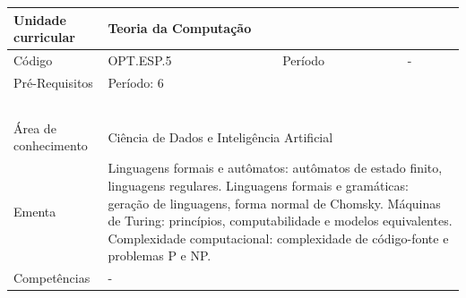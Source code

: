 \clearpage
\newpage

\begin{quadro}[ht!]
  \centering\scriptsize
\caption{Unidade Curricular Teoria da Computação}

\begin{tabular}{|p{2.5cm}|p{2.5cm}|p{2.5cm}|p{2.5cm}|p{2.5cm}|}\hline

  Unidade curricular & \multicolumn{4}{p{10cm}|}{ Teoria da Computação }\\\hline
  Código & OPT.ESP.5 & Período & \multicolumn{2}{p{5cm}|}{ - }\\\hline
  Pré-Requisitos & \multicolumn{4}{p{10cm}|}{ Período: 6 } \\\hline
  \cellcolor{blue1}{ CH PRESENCIAL } &
    \cellcolor{blue1}{CH EAD Síncrona} &
    \cellcolor{blue1}{CH EAD Síncrona Mediada} &
    \cellcolor{blue1}{CH EAD Assíncrona} &
    \cellcolor{blue1}{CH APCC} \\\hline
  \cellcolor{blue1}{ 60 } &
    \cellcolor{blue1}{ 0 } &
    \cellcolor{blue1}{ 30 } &
    \cellcolor{blue1}{ 30 } &
    \cellcolor{blue1}{0} \\\hline
  \cellcolor{blue1}{ CH Teórica } &
    \cellcolor{blue1}{CH Prática} &
    \cellcolor{blue1}{CH Humanidades} &
    \cellcolor{blue1}{CH Extensão} &
    \cellcolor{blue1}{CH EAD TOTAL} \\\hline
  \cellcolor{blue1}{ 30 } &
    \cellcolor{blue1}{ 30 } &
    \cellcolor{blue1}{ 0 } &
    \cellcolor{blue1}{ 0 } &
    \cellcolor{blue1}{ 60 } \\\hline
  \cellcolor{blue1}{CARGA-HORÁRIA TOTAL} & \multicolumn{4}{p{10cm}|}{ \cellcolor{blue1}{ 60 } } \\\hline
  Área de conhecimento & \multicolumn{4}{p{10cm}|}{ Ciência de Dados e Inteligência Artificial } \\\hline
  Ementa & \multicolumn{4}{p{10cm}|}{ Linguagens formais e autômatos: autômatos de estado finito, linguagens regulares. Linguagens formais e gramáticas: geração de linguagens, forma normal de Chomsky. Máquinas de Turing: princípios, computabilidade e modelos equivalentes. Complexidade computacional: complexidade de código-fonte e problemas P e NP. } \\\hline
  Competências & \multicolumn{4}{p{10cm}|}{ - } \\\hline


  
	\end{tabular}

\end{quadro}


